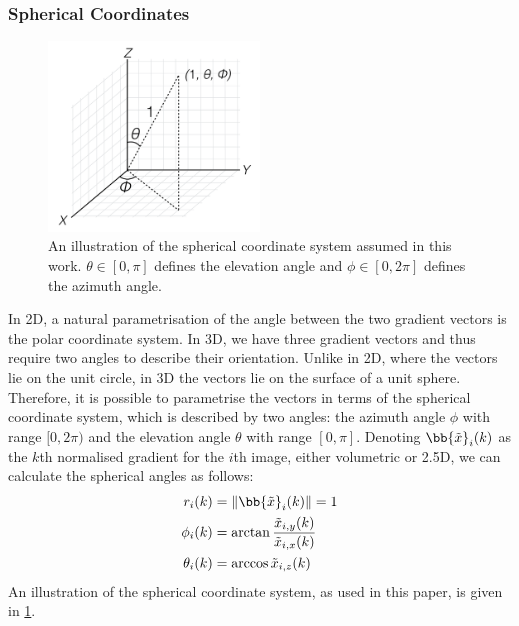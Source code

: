 \subsubsection{Spherical Coordinates}\label{subsubsec:singl_img_cosine_spherical}
\begin{figure}
    \centering
    \includegraphics[width=0.5\textwidth]{statistical_normals/images/spherical_coords_example}
    \caption{An illustration of the spherical coordinate system assumed in this
             work. $\theta \in [0, \pi]$ defines the elevation angle and
             $\phi \in [0, 2\pi]$ defines the azimuth angle.}
\label{fig:singl_img_spherical_coords_example}
\end{figure}
In 2D, a natural parametrisation of the angle between the two gradient vectors
is the polar coordinate system. In 3D, we have three gradient vectors and thus
require two angles to describe their orientation. Unlike in 2D, where the
vectors lie on the unit circle, in 3D the vectors lie on the surface of a unit
sphere. Therefore, it is possible to parametrise the vectors in terms of the
spherical coordinate system, which is described by two angles: the azimuth angle
$\phi$ with range $[0, 2\pi)$ and the elevation angle $\theta$ with range
$[0, \pi]$. Denoting ${\bb{\tilde{x}}_i}(k)$ as the $k$th normalised gradient
for the $i$th image, either volumetric or 2.5D, we can calculate the spherical angles as follows:
\begin{equation}\label{eq:cartesian_to_spherical}
    \begin{aligned}
        r_i(k)      &= \lVert \bb{\tilde{x}}_{i}(k) \rVert = 1            \\
        \phi_i(k)   &= \arctan{\frac{\tilde{x}_{i,y}(k)}{\tilde{x}_{i,x}(k)}} \\
        \theta_i(k) &= \arccos{\tilde{x}_{i,z}(k)}
    \end{aligned}
\end{equation}
An illustration of the spherical coordinate system, as used in this paper, is
given in \cref{fig:singl_img_spherical_coords_example}.

